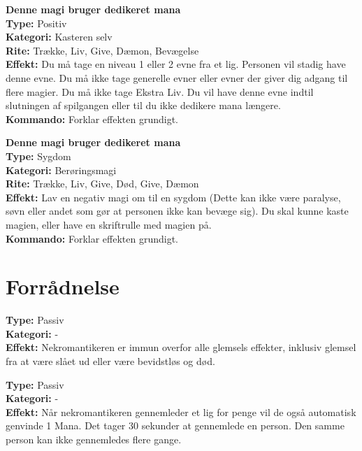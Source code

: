\begin{nSjæl*}
\textbf{Denne magi bruger dedikeret mana}\\
\textbf{Type:} Positiv\\
\textbf{Kategori:} Kasteren selv\\
\textbf{Rite:} Trække, Liv, Give, Dæmon, Bevægelse\\
\textbf{Effekt:} Du må tage en niveau 1 eller 2 evne fra et lig. Personen vil stadig have denne evne. Du må ikke tage generelle evner eller evner der giver dig adgang til flere magier. Du må ikke tage Ekstra Liv. Du vil have denne evne indtil slutningen af spilgangen eller til du ikke dedikere mana længere.\\
\textbf{Kommando:} Forklar effekten grundigt.\\
\end{nSjæl*}

\begin{nSjæl*}
\textbf{Denne magi bruger dedikeret mana}\\
\textbf{Type:} Sygdom\\
\textbf{Kategori:} Berøringsmagi\\
\textbf{Rite:} Trække, Liv, Give, Død, Give, Dæmon\\
\textbf{Effekt:} Lav en negativ magi om til en sygdom (Dette kan ikke være paralyse, søvn eller andet som gør at personen ikke kan bevæge sig). Du skal kunne kaste magien, eller have en skriftrulle med magien på.\\
\textbf{Kommando:} Forklar effekten grundigt.
\end{nSjæl*}

\section{Forrådnelse}

\begin{død*}
\textbf{Type:} Passiv\\
\textbf{Kategori:} -\\
\textbf{Effekt:} Nekromantikeren er immun overfor alle glemsels effekter, inklusiv glemsel fra at være slået ud eller være bevidstløs og død.
\end{død*}

\begin{død*}
\textbf{Type:} Passiv \\
\textbf{Kategori:} -\\
\textbf{Effekt:} Når nekromantikeren gennemleder et lig for penge vil de også automatisk genvinde 1 Mana. Det tager 30 sekunder at gennemlede en person. Den samme person kan ikke gennemledes flere gange.\\
\end{død*}

